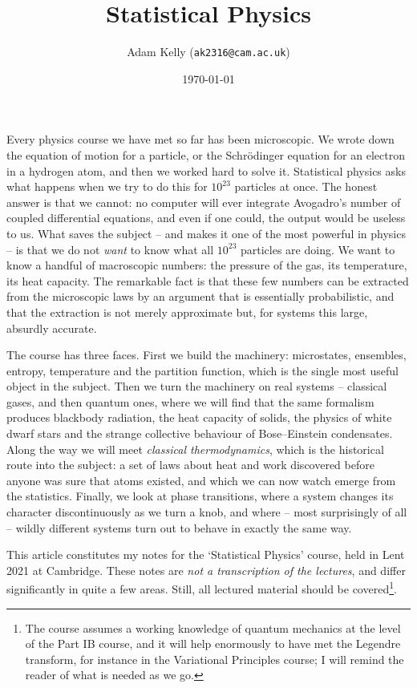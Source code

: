 \documentclass[a4paper]{scrartcl}
\title{Statistical Physics}
\author{Adam Kelly (\texttt{ak2316@cam.ac.uk})}
\date{\today}
\begin{document}
\maketitle

Every physics course we have met so far has been microscopic. We wrote down the equation of motion for a particle, or the Schr\"odinger equation for an electron in a hydrogen atom, and then we worked hard to solve it. Statistical physics asks what happens when we try to do this for $10^{23}$ particles at once. The honest answer is that we cannot: no computer will ever integrate Avogadro's number of coupled differential equations, and even if one could, the output would be useless to us. What saves the subject -- and makes it one of the most powerful in physics -- is that we do not \emph{want} to know what all $10^{23}$ particles are doing. We want to know a handful of macroscopic numbers: the pressure of the gas, its temperature, its heat capacity. The remarkable fact is that these few numbers can be extracted from the microscopic laws by an argument that is essentially probabilistic, and that the extraction is not merely approximate but, for systems this large, absurdly accurate.

The course has three faces. First we build the machinery: microstates, ensembles, entropy, temperature and the partition function, which is the single most useful object in the subject. Then we turn the machinery on real systems -- classical gases, and then quantum ones, where we will find that the same formalism produces blackbody radiation, the heat capacity of solids, the physics of white dwarf stars and the strange collective behaviour of Bose--Einstein condensates. Along the way we will meet \emph{classical thermodynamics}, which is the historical route into the subject: a set of laws about heat and work discovered before anyone was sure that atoms existed, and which we can now watch emerge from the statistics. Finally, we look at phase transitions, where a system changes its character discontinuously as we turn a knob, and where -- most surprisingly of all -- wildly different systems turn out to behave in exactly the same way.

This article constitutes my notes for the `Statistical Physics' course, held in Lent 2021 at Cambridge. These notes are \emph{not a transcription of the lectures}, and differ significantly in quite a few areas. Still, all lectured material should be covered\footnote{The course assumes a working knowledge of quantum mechanics at the level of the Part IB course, and it will help enormously to have met the Legendre transform, for instance in the Variational Principles course; I will remind the reader of what is needed as we go.}.
\end{document}
